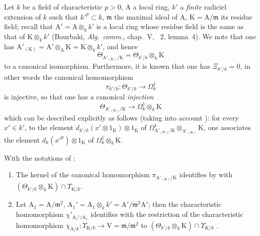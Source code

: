 \begin{env}[22.5.5]
\label{0.22.5.5}
Let $k$ be a field of characteristic $p>0$, $\mathrm{A}$ a local ring, $k'$ a \emph{finite} radiciel extension of $k$ such that $k'^p\subset k$, $\mathfrak{m}$ the maximal ideal of $\mathrm{A}$, $\mathrm{K}=\mathrm{A}/\mathfrak{m}$ its residue field; recall that $\mathrm{A}'=\mathrm{A}\otimes_kk'$ is a local ring whose residue field is the same as that of $\mathrm{K}\otimes_kk'$ (Bourbaki, \emph{Alg.~comm.}, chap.~V, \textsection~2, lemma~4).
We note that one has $\mathrm{A}'_{(\mathrm{K})}=\mathrm{A}'\otimes_\mathrm{A}\mathrm{K}=\mathrm{K}\otimes_kk'$, and hence 
\[
\label{0.22.5.5.1}
  \Theta_{\mathrm{A}'_{(\mathrm{K})}/\mathrm{K}}=\Theta_{k'/k}\otimes_k\mathrm{K}
  \tag{22.5.5.1}
\]
to a canonical isomorphism.
Furthermore, it is known  that one has $\Xi_{k'/k}=0$, in other words the canonical homomorphism 
\[
  \pi_{k'/k}:\Theta_{k'/k}\to\Omega^1_k
\]
is injective, so that one has a canonical \emph{injection}
\[
\label{0.22.5.5.2}
  \Theta_{\mathrm{A}'_{(\mathrm{K})}/\mathrm{K}}\to\Omega^1_k\otimes_k\mathrm{K}
  \tag{22.5.5.2}
\]
which can be described explicitly as follows (taking into account ): for every $x'\in k'$, to the element $d_{k'/k}(x'\otimes 1_\mathrm{K})\otimes 1_\mathrm{K}$ of $\Omega^1_{\mathrm{A}'_{(\mathrm{K})}/\mathrm{K}}\otimes_{\mathrm{A}'_{(\mathrm{K})}}\mathrm{K}$, one associates the element $d_k(x'^p)\otimes 1_\mathrm{K}$ of $\Omega^1_k\otimes_k\mathrm{K}$.
\end{env}

\begin{lemma}[22.5.6]
\label{0.22.5.6}
With the notations of :
\begin{enumerate}
  \item[\rm{(i)}] The kernel of the canonical homomorphism $\pi_{\mathrm{A}'_{(\mathrm{K})}/\mathrm{K}}$  identifies by  with $(\Theta_{k'/k}\otimes_k\mathrm{K})\cap\Upsilon_{\mathrm{K}/k}$.
  \item[\rm{(ii)}] Let $\mathrm{A}_1=\mathrm{A}/\mathfrak{m}^2$, $\mathrm{A}_1'=\mathrm{A}_1\otimes_kk'=\mathrm{A}'/\mathfrak{m}^2\mathrm{A}'$; then the characteristic homomorphism $\chi'_{\mathrm{A}_1'/\mathrm{A}_1}$  identifies with the restriction of the characteristic homomorphism $\chi_{\mathrm{A}/k}:\Upsilon_{\mathrm{K}/k}\to\mathrm{V}=\mathfrak{m}/\mathfrak{m}^2$ to $(\Theta_{k'/k}\otimes_k\mathrm{K})\cap\Upsilon_{\mathrm{K}/k}$ .
\end{enumerate}
\end{lemma}

